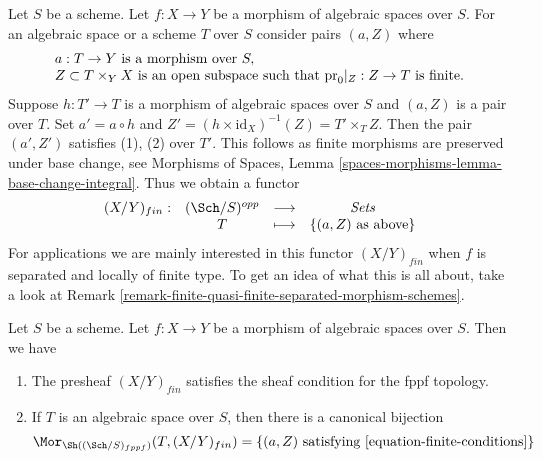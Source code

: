 \noindent
Let $S$ be a scheme.
Let $f : X \to Y$ be a morphism of algebraic spaces over $S$.
For an algebraic space or a scheme $T$ over $S$ consider pairs
$(a, Z)$ where
\begin{equation}
\label{equation-finite-conditions}
\begin{matrix}
a : T \to Y\text{ is a morphism over }S, \hfill \\
Z \subset T \times_Y X\text{ is an open subspace such that }
\text{pr}_0|_Z : Z \to T\text{ is finite.}
\end{matrix}
\end{equation}
Suppose $h : T' \to T$ is a morphism of algebraic spaces over $S$
and $(a, Z)$ is a pair over $T$. Set
$a' = a \circ h$ and $Z' = (h \times \text{id}_X)^{-1}(Z) = T' \times_T Z$.
Then the pair $(a', Z')$ satisfies (1), (2) over $T'$.
This follows as finite morphisms are preserved under base change, see
Morphisms of Spaces, Lemma \ref{spaces-morphisms-lemma-base-change-integral}.
Thus we obtain a functor
\begin{equation}
\label{equation-finite}
\begin{matrix}
(X/Y)_{fin} : &
(\Sch/S)^{opp} &
\longrightarrow &
\textit{Sets} \\
& T & \longmapsto &
\{(a, Z)\text{ as above}\}
\end{matrix}
\end{equation}
For applications we are mainly interested in this functor $(X/Y)_{fin}$
when $f$ is separated and locally of finite type. To get an idea
of what this is all about, take a look at
Remark \ref{remark-finite-quasi-finite-separated-morphism-schemes}.

\begin{lemma}
\label{lemma-finite-sheaf}
Let $S$ be a scheme.
Let $f : X \to Y$ be a morphism of algebraic spaces over $S$.
Then we have
\begin{enumerate}
\item The presheaf $(X/Y)_{fin}$ satisfies the sheaf condition for
the fppf topology.
\item If $T$ is an algebraic space over $S$, then there is a
canonical bijection
$$
\Mor_{\Sh((\Sch/S)_{fppf})}(T, (X/Y)_{fin})
=
\{(a, Z)\text{ satisfying \ref{equation-finite-conditions}}\}
$$
\end{enumerate}
\end{lemma}

